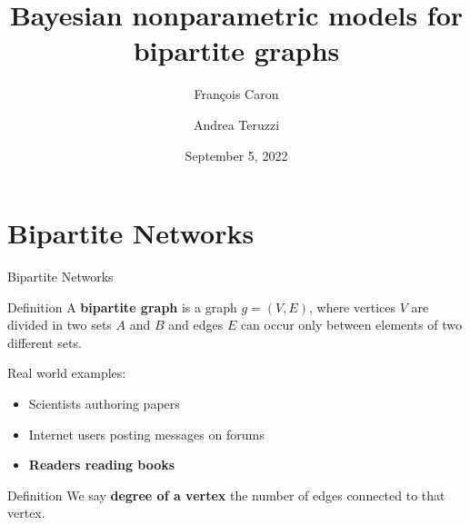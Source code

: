 \documentclass[aspectratio=169,xcolor=dvipsnames]{beamer}
\title[BNP models for bipartite graphs, F. Caron]{Bayesian nonparametric models for bipartite graphs
} \subtitle{François Caron}
\author[Andrea Teruzzi] {Andrea Teruzzi}
\date[20605 - Machine Learning II]{September 5, 2022}
\begin{document}
\begin{frame}
    \titlepage
\end{frame}



\section{Bipartite Networks} %
\begin{frame}{Bipartite Networks}
\begin{block}{Definition}
    A \textbf{bipartite graph} is a graph $g=(V, E)$, where vertices $V$ are divided in two sets $A$ and $B$ and edges $E$ can occur only between elements of two different sets.
    \vspace{5pt}
\end{block}
\pause
Real world examples:
\begin{itemize}
    \item Scientists authoring papers
    \item Internet users posting messages on forums
    \item \textbf{Readers reading books}
\end{itemize}
\pause
\begin{block}{Definition}
    We say \textbf{degree of a vertex} the number of edges connected to that vertex.
    \vspace{5pt}
\end{block}

\end{frame}
\end{document}
